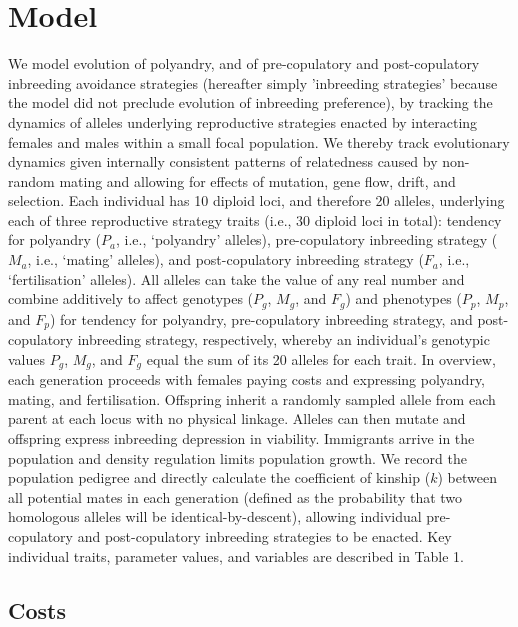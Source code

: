 \documentclass[10pt,letterpaper]{article}
\begin{document}
\section*{Model}

We model evolution of polyandry, and of pre-copulatory and post-copulatory inbreeding avoidance strategies (hereafter simply 'inbreeding strategies' because the model did not preclude evolution of inbreeding preference), by tracking the dynamics of alleles underlying reproductive strategies enacted by interacting females and males within a small focal population. We thereby track evolutionary dynamics given internally consistent patterns of relatedness caused by non-random mating and allowing for effects of mutation, gene flow, drift, and selection. Each individual has 10 diploid loci, and therefore 20 alleles, underlying each of three reproductive strategy traits (i.e., 30 diploid loci in total): tendency for polyandry ($P_{a}$, i.e., `polyandry' alleles), pre-copulatory inbreeding strategy ($M_{a}$, i.e., `mating' alleles), and post-copulatory inbreeding strategy ($F_{a}$, i.e., `fertilisation' alleles). All alleles can take the value of any real number \cite[i.e., a continuum-of-alleles model;][]{Kimura1965, Lande1976, Reeve2000, Bocedi2014} and combine additively to affect genotypes ($P_{g}$, $M_{g}$, and $F_{g}$) and phenotypes ($P_{p}$, $M_{p}$, and $F_{p}$) for tendency for polyandry, pre-copulatory inbreeding strategy, and post-copulatory inbreeding strategy, respectively, whereby an individual's genotypic values $P_{g}$, $M_{g}$, and $F_{g}$ equal the sum of its 20 alleles for each trait. In overview, each generation proceeds with females paying costs and expressing polyandry, mating, and fertilisation. Offspring inherit a randomly sampled allele from each parent at each locus with no physical linkage. Alleles can then mutate and offspring express inbreeding depression in viability. Immigrants arrive in the population and density regulation limits population growth. We record the population pedigree and directly calculate the coefficient of kinship ($k$) between all potential mates in each generation (defined as the probability that two homologous alleles will be identical-by-descent), allowing individual pre-copulatory and post-copulatory inbreeding strategies to be enacted. Key individual traits, parameter values, and variables are described in Table 1.

\subsection*{Costs}
\end{document}
